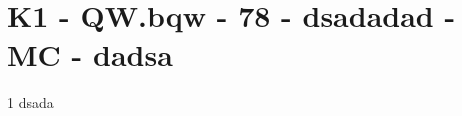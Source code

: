 \section{K1 - QW.bqw - 78 - dsadadad - MC - dadsa}

\begin{langesbeispiel}\item[1] %
dsada

\end{langesbeispiel}